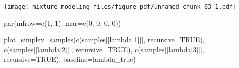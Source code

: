 \documentclass[
  letterpaper,
  DIV=11,
  numbers=noendperiod]{scrartcl}
\newenvironment{Shaded}{\begin{snugshade}}{\end{snugshade}}
\newcommand{\AttributeTok}[1]{\textcolor[rgb]{0.40,0.45,0.13}{#1}}
\newcommand{\ConstantTok}[1]{\textcolor[rgb]{0.56,0.35,0.01}{#1}}
\newcommand{\ControlFlowTok}[1]{\textcolor[rgb]{0.00,0.23,0.31}{#1}}
\newcommand{\DecValTok}[1]{\textcolor[rgb]{0.68,0.00,0.00}{#1}}
\newcommand{\FunctionTok}[1]{\textcolor[rgb]{0.28,0.35,0.67}{#1}}
\newcommand{\NormalTok}[1]{\textcolor[rgb]{0.00,0.23,0.31}{#1}}
\newcommand{\OtherTok}[1]{\textcolor[rgb]{0.00,0.23,0.31}{#1}}
\newcommand{\SpecialCharTok}[1]{\textcolor[rgb]{0.37,0.37,0.37}{#1}}
\newcommand{\StringTok}[1]{\textcolor[rgb]{0.13,0.47,0.30}{#1}}
\begin{document}
\begin{Shaded}
\end{Shaded}

\texttt{[image: mixture\_modeling\_files/figure-pdf/unnamed-chunk-63-1.pdf]}

\begin{Shaded}
\begin{Highlighting}[]
\FunctionTok{par}\NormalTok{(}\AttributeTok{mfrow=}\FunctionTok{c}\NormalTok{(}\DecValTok{1}\NormalTok{, }\DecValTok{1}\NormalTok{), }\AttributeTok{mar=}\FunctionTok{c}\NormalTok{(}\DecValTok{0}\NormalTok{, }\DecValTok{0}\NormalTok{, }\DecValTok{0}\NormalTok{, }\DecValTok{0}\NormalTok{))}

\FunctionTok{plot\_simplex\_samples}\NormalTok{(}\FunctionTok{c}\NormalTok{(samples[[}\StringTok{\textquotesingle{}lambda[1]\textquotesingle{}}\NormalTok{]], }\AttributeTok{recursive=}\ConstantTok{TRUE}\NormalTok{),}
                     \FunctionTok{c}\NormalTok{(samples[[}\StringTok{\textquotesingle{}lambda[2]\textquotesingle{}}\NormalTok{]], }\AttributeTok{recursive=}\ConstantTok{TRUE}\NormalTok{),}
                     \FunctionTok{c}\NormalTok{(samples[[}\StringTok{\textquotesingle{}lambda[3]\textquotesingle{}}\NormalTok{]], }\AttributeTok{recursive=}\ConstantTok{TRUE}\NormalTok{),}
                     \AttributeTok{baseline=}\NormalTok{lambda\_true)}
\end{Highlighting}
\end{Shaded}
\end{document}
